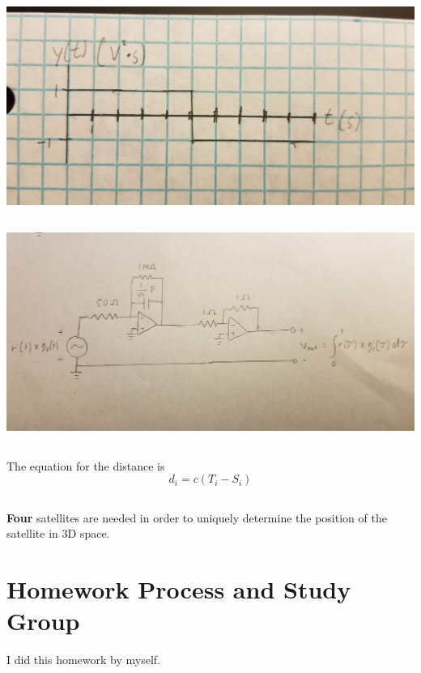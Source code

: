 \documentclass[]{article}
\begin{document}
\subsection{}

\begin{center}
	\includegraphics[width=0.7\linewidth]{20191122_024506}
\end{center}

\subsection{}

\begin{center}
	\includegraphics[width=0.7\linewidth]{20191122_024720}
\end{center}

\subsection{}

The equation for the distance is
\begin{equation}
	d_i = c (T_i - S_i)
\end{equation}

\subsection{}

\textbf{Four} satellites are needed in order to uniquely determine the position of the satellite in 3D space. 

\section{Homework Process and Study Group}

I did this homework by myself. 

\newpage


\end{document}
